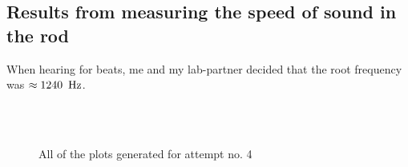 \documentclass[11pt,a4paper]{article}
\begin{document}
  \subsection{Results from measuring the speed of sound in the rod}

    When hearing for beats, me and my lab-partner decided that the root frequency was $\approx 1240\enspace\textup{Hz}$.
    \newline
    \begin{figure}[H]
      \centering
       \\
       \\
      \caption{All of the plots generated for attempt no. 4}
      \label{fig:sound_exp1}
    \end{figure}
\end{document}
